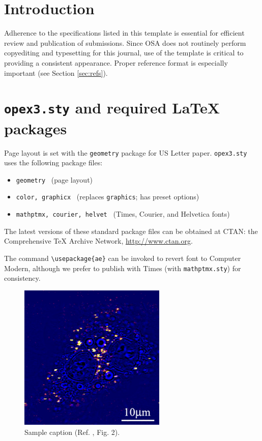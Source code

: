 \documentclass[10pt,letterpaper]{article}
\begin{document}
\section{Introduction}
Adherence to the specifications listed in this template is essential for efficient review and publication of submissions. Since OSA does not routinely perform copyediting and typesetting for this journal, use of the template is critical to providing a consistent appearance. Proper reference format is especially important (see Section \ref{sec:refs}).

\section{\texttt{opex3.sty} and required \LaTeX{} packages}
Page layout is set with the \texttt{geometry} package for US Letter paper. \texttt{opex3.sty} uses the following package files:

\begin{itemize}
\item \texttt{geometry} \ (page layout)
\item \texttt{color, graphicx} \ (replaces \texttt{graphics}; has preset options)
\item \texttt{mathptmx, courier, helvet} \ (Times, Courier, and Helvetica fonts) 
\end{itemize}

The latest versions of these standard package files can be obtained at CTAN: the Comprehensive TeX Archive Network, \url{http://www.ctan.org}.

\bigskip

\noindent The command \verb+\usepackage{ae}+ can be invoked to revert font to Computer Modern, although we prefer to publish with Times (with \texttt{mathptmx.sty}) for consistency.

\begin{figure}[htb]
\centering\includegraphics[width=7cm]{opexfig1}
\caption{Sample caption (Ref. \cite{Oron03}, Fig. 2).}
\end{figure}
\end{document}
